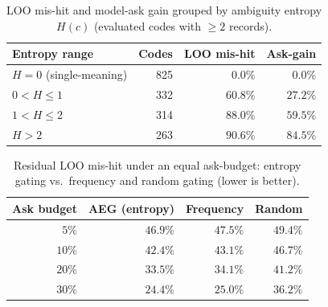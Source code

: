 \begin{table}[htbp]
\centering
\caption{LOO mis-hit and model-ask gain grouped by ambiguity entropy $H(c)$ (evaluated codes with $\ge 2$ records).}
\label{tab:aeg_buckets}
\renewcommand{\arraystretch}{1.2}
\begin{tabular}{lrrr}
\hline
\textbf{Entropy range} & \textbf{Codes} & \textbf{LOO mis-hit} & \textbf{Ask-gain} \\
\hline
$H=0$ (single-meaning) & 825 & $0.0\%$ & $0.0\%$ \\
$0<H\le 1$ & 332 & $60.8\%$ & $27.2\%$ \\
$1<H\le 2$ & 314 & $88.0\%$ & $59.5\%$ \\
$H>2$ & 263 & $90.6\%$ & $84.5\%$ \\
\hline
\end{tabular}
\end{table}

\begin{table}[htbp]
\centering
\caption{Residual LOO mis-hit under an equal ask-budget: entropy gating vs.\ frequency and random gating (lower is better).}
\label{tab:aeg_tradeoff}
\renewcommand{\arraystretch}{1.2}
\begin{tabular}{rrrr}
\hline
\textbf{Ask budget} & \textbf{AEG (entropy)} & \textbf{Frequency} & \textbf{Random} \\
\hline
$5\%$  & $\mathbf{46.9\%}$ & $47.5\%$ & $49.4\%$ \\
$10\%$ & $\mathbf{42.4\%}$ & $43.1\%$ & $46.7\%$ \\
$20\%$ & $\mathbf{33.5\%}$ & $34.1\%$ & $41.2\%$ \\
$30\%$ & $\mathbf{24.4\%}$ & $25.0\%$ & $36.2\%$ \\
\hline
\end{tabular}
\end{table}

